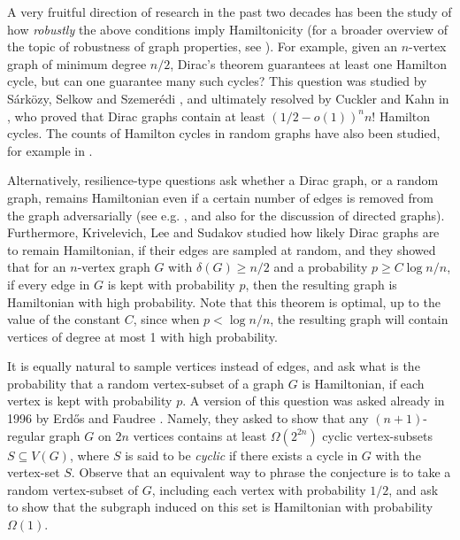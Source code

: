 \documentclass[a4paper,11pt]{article}
\theoremstyle{definition}
\begin{document}
A very fruitful direction of research in the past two decades has been the study of how \textit{robustly} the above conditions imply Hamiltonicity (for a broader overview of the topic of robustness of graph properties, see \cite{S}). For example, given an $n$-vertex graph of minimum degree $n/2$, Dirac's theorem guarantees at least one Hamilton cycle, but can one guarantee many such cycles? This question was studied by S\'ark\"ozy, Selkow and Szemer\'edi \cite{SSS}, and ultimately resolved by Cuckler and Kahn in \cite{CK}, who proved that Dirac graphs contain at least $(1/2-o(1))^n n!$ Hamilton cycles. The counts of Hamilton cycles in random graphs have also been studied, for example in \cite{FKL, GK}.

Alternatively, resilience-type questions ask whether a Dirac graph, or a random graph, remains Hamiltonian even if a certain number of edges is removed from the graph adversarially (see e.g. \cite{FK, LS, M1, NST, SV}, and also \cite{HSS, FNNPS, M2} for the discussion of directed graphs). Furthermore, Krivelevich, Lee and Sudakov \cite{KLS} studied how likely Dirac graphs are to remain Hamiltonian, if their edges are sampled at random, and they showed that for an $n$-vertex graph $G$ with $\delta(G)\geq n/2$ and a probability $p\geq C\log n/n$, if every edge in $G$ is kept with probability $p$, then the resulting graph is Hamiltonian with high probability. Note that this theorem is optimal, up to the value of the constant $C$, since when $p<\log n/n$, the resulting graph will contain vertices of degree at most 1 with high probability.

It is equally natural to sample vertices instead of edges, and ask what is the probability that a random vertex-subset of a graph $G$ is Hamiltonian, if each vertex is kept with probability $p$. A version of this question was asked already in 1996 by Erd\H{o}s and Faudree \cite{E}. Namely, they asked to show that any $(n+1)$-regular graph $G$ on $2n$ vertices contains at least $\Omega(2^{2n})$ cyclic vertex-subsets $S\subseteq V(G)$, where $S$ is said to be \textit{cyclic} if there exists a cycle in $G$ with the vertex-set $S$. Observe that an equivalent way to phrase the conjecture is to take a random vertex-subset of $G$, including each vertex with probability $1/2$, and ask to show that the subgraph induced on this set is Hamiltonian with probability $\Omega(1)$.
\end{document}
